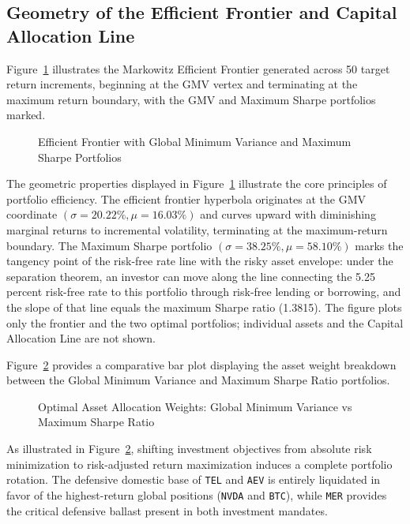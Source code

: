\subsection{Geometry of the Efficient Frontier and Capital Allocation Line}

Figure~\ref{fig:efficient_frontier} illustrates the Markowitz Efficient Frontier generated across 50 target return increments, beginning at the GMV vertex and terminating at the maximum return boundary, with the GMV and Maximum Sharpe portfolios marked.

\begin{figure}[H]
  \centering
  \caption{Efficient Frontier with Global Minimum Variance and Maximum Sharpe Portfolios}
  \label{fig:efficient_frontier}
\end{figure}

The geometric properties displayed in Figure~\ref{fig:efficient_frontier} illustrate the core principles of portfolio efficiency. The efficient frontier hyperbola originates at the GMV coordinate $(\sigma = 20.22\%, \mu = 16.03\%)$ and curves upward with diminishing marginal returns to incremental volatility, terminating at the maximum-return boundary. The Maximum Sharpe portfolio $(\sigma = 38.25\%, \mu = 58.10\%)$ marks the tangency point of the risk-free rate line with the risky asset envelope: under the separation theorem, an investor can move along the line connecting the 5.25 percent risk-free rate to this portfolio through risk-free lending or borrowing, and the slope of that line equals the maximum Sharpe ratio (1.3815). The figure plots only the frontier and the two optimal portfolios; individual assets and the Capital Allocation Line are not shown.

Figure~\ref{fig:portfolio_allocation} provides a comparative bar plot displaying the asset weight breakdown between the Global Minimum Variance and Maximum Sharpe Ratio portfolios.

\begin{figure}[H]
  \centering
  \caption{Optimal Asset Allocation Weights: Global Minimum Variance vs Maximum Sharpe Ratio}
  \label{fig:portfolio_allocation}
\end{figure}

As illustrated in Figure~\ref{fig:portfolio_allocation}, shifting investment objectives from absolute risk minimization to risk-adjusted return maximization induces a complete portfolio rotation. The defensive domestic base of \texttt{TEL} and \texttt{AEV} is entirely liquidated in favor of the highest-return global positions (\texttt{NVDA} and \texttt{BTC}), while \texttt{MER} provides the critical defensive ballast present in both investment mandates.
